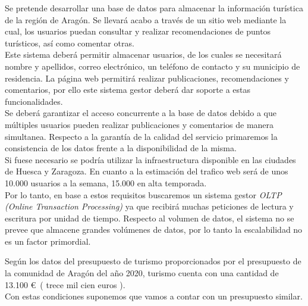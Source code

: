 \documentclass{article}
\begin{document}
Se pretende desarrollar una base de datos para almacenar la información turística de la región de Aragón. Se llevará acabo a través de un sitio web mediante la cual, los usuarios puedan consultar y realizar recomendaciones  de puntos turísticos, así como comentar otras.\\
Este sistema deberá permitir almacenar usuarios, de los cuales se necesitará nombre y apellidos, correo electrónico, un teléfono de contacto y su municipio de residencia. La página web permitirá realizar publicaciones, recomendaciones y comentarios, por ello este sistema gestor deberá dar soporte a estas funcionalidades. \\
Se deberá garantizar el acceso concurrente a la base de datos debido a que múltiples usuarios pueden realizar publicaciones y comentarios de manera simultanea.
Respecto a la garantía de la calidad del servicio primaremos la consistencia de los datos frente a la disponibilidad de la misma.\\

Si fuese necesario se podría utilizar la infraestructura disponible en las ciudades de Huesca y Zaragoza. En cuanto a la  estimación del trafico web será de unos 10.000 usuarios a la semana, 15.000 en alta temporada.\\

Por lo tanto, en base a estos requisitos buscaremos un sistema gestor \textit{OLTP (Online Transaction Processing)} ya que recibirá muchas peticiones de lectura y escritura por unidad de tiempo. Respecto al volumen de datos, el sistema no se prevee que almacene grandes volúmenes de datos, por lo tanto la escalabilidad no es un factor primordial.

Según los datos del presupuesto de turismo proporcionados por el presupuesto de la comunidad de Aragón del año 2020, turismo cuenta con una cantidad de 13.100 \euro \ ( trece mil cien euros ).\\
 Con estas condiciones suponemos que vamos a contar con un presupuesto similar.
\end{document}
